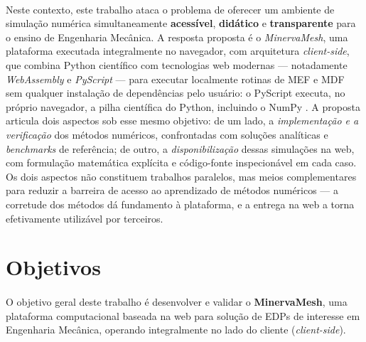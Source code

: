 \paragraph{}Neste contexto, este trabalho ataca o problema de oferecer um ambiente de simulação numérica simultaneamente \textbf{acessível}, \textbf{didático} e \textbf{transparente} para o ensino de Engenharia Mecânica. A resposta proposta é o \textit{MinervaMesh}, uma plataforma executada integralmente no navegador, com arquitetura \textit{client-side}, que combina Python científico com tecnologias web modernas --- notadamente \textit{WebAssembly} e \textit{PyScript} --- para executar localmente rotinas de MEF e MDF sem qualquer instalação de dependências pelo usuário: o PyScript \cite{PyScript2023} executa, no próprio navegador, a pilha científica do Python, incluindo o NumPy \cite{Harris2020}. A proposta articula dois aspectos sob esse mesmo objetivo: de um lado, a \textit{implementação e a verificação} dos métodos numéricos, confrontadas com soluções analíticas e \textit{benchmarks} de referência; de outro, a \textit{disponibilização} dessas simulações na web, com formulação matemática explícita e código-fonte inspecionável em cada caso. Os dois aspectos não constituem trabalhos paralelos, mas meios complementares para reduzir a barreira de acesso ao aprendizado de métodos numéricos --- a corretude dos métodos dá fundamento à plataforma, e a entrega na web a torna efetivamente utilizável por terceiros.

\section{Objetivos}

\paragraph{}O objetivo geral deste trabalho é desenvolver e validar o \textbf{MinervaMesh}, uma plataforma computacional baseada na web para solução de EDPs de interesse em Engenharia Mecânica, operando integralmente no lado do cliente (\textit{client-side}).


